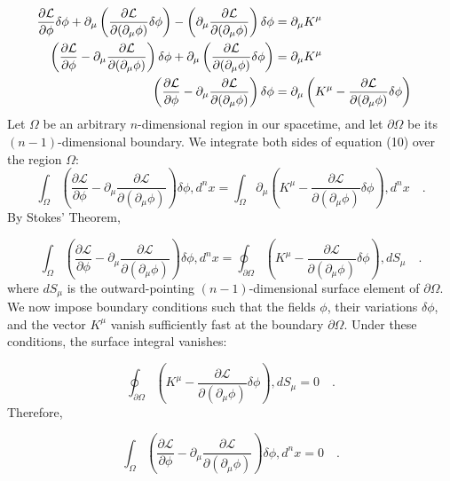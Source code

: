\documentclass{article}
\begin{document}
\begin{align*}
\frac{\partial \mathcal{L}}{\partial \phi} \delta \phi + \partial_\mu \left( \frac{\partial \mathcal{L}}{\partial (\partial_\mu \phi)} \delta \phi \right) - \left( \partial_\mu \frac{\partial \mathcal{L}}{\partial (\partial_\mu \phi)} \right) \delta \phi &= \partial_\mu K^\mu \cr
\left( \frac{\partial \mathcal{L}}{\partial \phi} - \partial_\mu \frac{\partial \mathcal{L}}{\partial (\partial_\mu \phi)} \right) \delta \phi + \partial_\mu \left( \frac{\partial \mathcal{L}}{\partial (\partial_\mu \phi)} \delta \phi \right) &= \partial_\mu K^\mu \cr
\left( \frac{\partial \mathcal{L}}{\partial \phi} - \partial_\mu \frac{\partial \mathcal{L}}{\partial (\partial_\mu \phi)} \right) \delta \phi &= \partial_\mu \left( K^\mu - \frac{\partial \mathcal{L}}{\partial (\partial_\mu \phi)} \delta \phi \right)
\end{align*}
Let $\Omega$ be an arbitrary $n$-dimensional region in our spacetime, and let $\partial \Omega$ be its $(n-1)$-dimensional boundary. We integrate both sides of equation (10) over the region $\Omega$:
\[
\int_\Omega \left( \frac{\partial \mathcal{L}}{\partial \phi} - \partial_\mu \frac{\partial \mathcal{L}}{\partial (\partial_\mu \phi)} \right) \delta \phi , d^n x = \int_\Omega \partial_\mu \left( K^\mu - \frac{\partial \mathcal{L}}{\partial (\partial_\mu \phi)} \delta \phi \right) , d^n x \quad .
\]
By Stokes' Theorem,

\[
\int_\Omega \left( \frac{\partial \mathcal{L}}{\partial \phi} - \partial_\mu \frac{\partial \mathcal{L}}{\partial (\partial_\mu \phi)} \right) \delta \phi , d^n x = \oint_{\partial \Omega} \left( K^\mu - \frac{\partial \mathcal{L}}{\partial (\partial_\mu \phi)} \delta \phi \right) , dS_\mu \quad .
\]
where $dS_\mu$ is the outward-pointing $(n-1)$-dimensional surface element of $\partial \Omega$.
We now impose boundary conditions such that the fields $\phi$, their variations $\delta \phi$, and the vector $K^\mu$ vanish sufficiently fast at the boundary $\partial \Omega$. Under these conditions, the surface integral vanishes:

\[
\oint_{\partial \Omega} \left( K^\mu - \frac{\partial \mathcal{L}}{\partial (\partial_\mu \phi)} \delta \phi \right) , dS_\mu = 0 \quad .
\]
Therefore,

\[
\int_\Omega \left( \frac{\partial \mathcal{L}}{\partial \phi} - \partial_\mu \frac{\partial \mathcal{L}}{\partial (\partial_\mu \phi)} \right) \delta \phi , d^n x = 0 \quad .
\]
\end{document}
